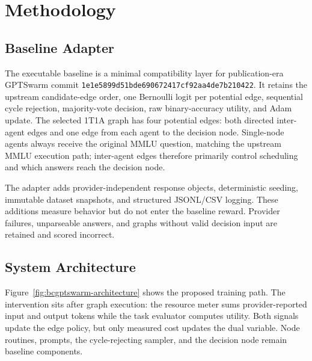 \section{Methodology}

\subsection{Baseline Adapter}

The executable baseline is a minimal compatibility layer for publication-era GPTSwarm commit \texttt{1e1e5899d51bde690672417cf92aa4de7b210422}. It retains the upstream candidate-edge order, one Bernoulli logit per potential edge, sequential cycle rejection, majority-vote decision, raw binary-accuracy utility, and Adam update. The selected 1T1A graph has four potential edges: both directed inter-agent edges and one edge from each agent to the decision node. Single-node agents always receive the original MMLU question, matching the upstream MMLU execution path; inter-agent edges therefore primarily control scheduling and which answers reach the decision node.

The adapter adds provider-independent response objects, deterministic seeding, immutable dataset snapshots, and structured JSONL/CSV logging. These additions measure behavior but do not enter the baseline reward. Provider failures, unparseable answers, and graphs without valid decision input are retained and scored incorrect.

\subsection{System Architecture}

Figure~\ref{fig:bcgptswarm-architecture} shows the proposed training path. The intervention sits after graph execution: the resource meter sums provider-reported input and output tokens while the task evaluator computes utility. Both signals update the edge policy, but only measured cost updates the dual variable. Node routines, prompts, the cycle-rejecting sampler, and the decision node remain baseline components.

